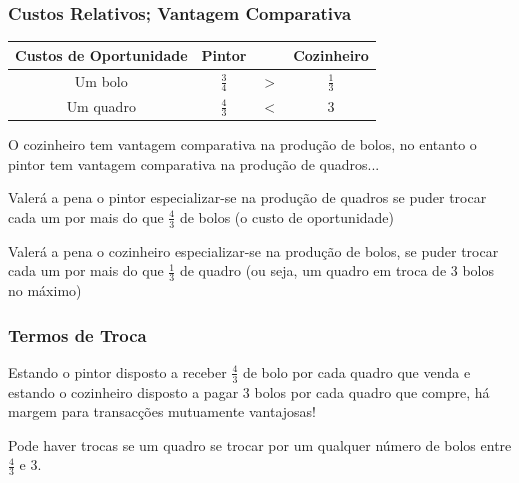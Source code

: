 \begin{frame}
	\frametitle{Custos Relativos; Vantagem Comparativa}

	\begin{table}
		{\renewcommand{\arraystretch}{1.5}
		\begin{tabular}{cccc}
			Custos de Oportunidade & Pintor & & Cozinheiro \\
			\hline \hline
			Um bolo & $\frac{3}{4}$ & $>$ & $\frac{1}{3}$ \\
			Um quadro & $\frac{4}{3}$ & $<$ & $3$ \\
			\hline \hline
		\end{tabular}
		}
	\end{table}\pause
	\small{
	O cozinheiro tem vantagem comparativa na produ\c c\~ao de bolos, no entanto o pintor tem vantagem comparativa na produ\c c\~ao de quadros... \pause

	\vspace{0.2cm}

	Valer\'a a pena o pintor especializar-se na produ\c c\~ao de quadros se puder trocar cada um por mais do que $\frac{4}{3}$ de bolos (o custo de oportunidade)\pause

	\vspace{0.2cm}

	Valer\'a a pena o cozinheiro especializar-se na produ\c c\~ao de bolos, se puder trocar cada um por mais do que $\frac{1}{3}$ de quadro (ou seja, um quadro em troca de $3$ bolos no m\'aximo)	
	}
\end{frame}

\begin{frame}
	\frametitle{Termos de Troca}

	Estando o pintor disposto a receber $\frac{4}{3}$ de bolo por cada quadro que venda e estando o cozinheiro disposto a pagar $3$ bolos por cada quadro que compre, h\'a margem para transac\c c\~oes mutuamente vantajosas! \pause

	\vspace{0.2cm}

	Pode haver trocas se um quadro se trocar por um qualquer n\'umero de bolos entre $\frac{4}{3}$ e $3$.

\end{frame}

